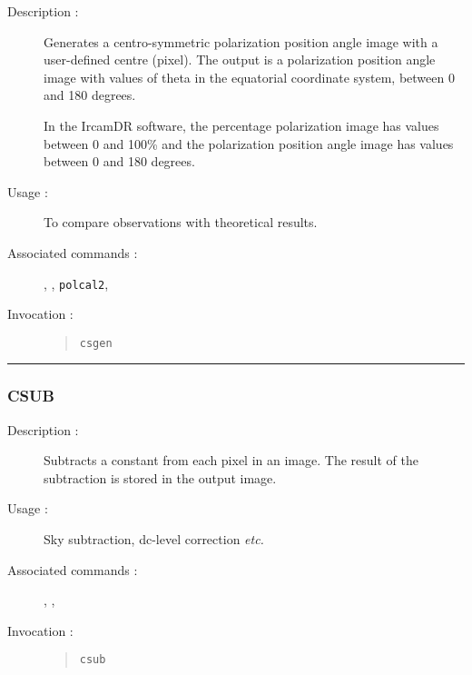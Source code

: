 \begin{description}

\item[Description :] Generates a centro-symmetric polarization position
angle image with a user-defined centre (pixel).  The output is a
polarization position angle image with values of theta in the
equatorial coordinate system, between 0 and 180 degrees.

In the {\sc IrcamDR} software, the percentage polarization image has
values between 0 and 100\% and the polarization position angle image
has values between 0 and 180 degrees.

\item[Usage :] To compare observations with theoretical results.

\item[Associated commands :] {\tt {}},
{\tt {}}, {\tt polcal2},
{\tt {}}

\item[Invocation :]

\begin{quote}{\tt  csgen }\end{quote}

\end{description}

\hrule
\subsubsection*{\label{CSUB}CSUB}

\begin{description}

\item[Description :] Subtracts a constant from each pixel in an image.
The result of the subtraction is stored in the output image.

\item[Usage :] Sky subtraction, dc-level correction \emph{etc.}

\item[Associated commands :] {\tt {}},
{\tt {}}, {\tt {}}

\item[Invocation :]

\begin{quote}{\tt  csub }\end{quote}

\end{description}

